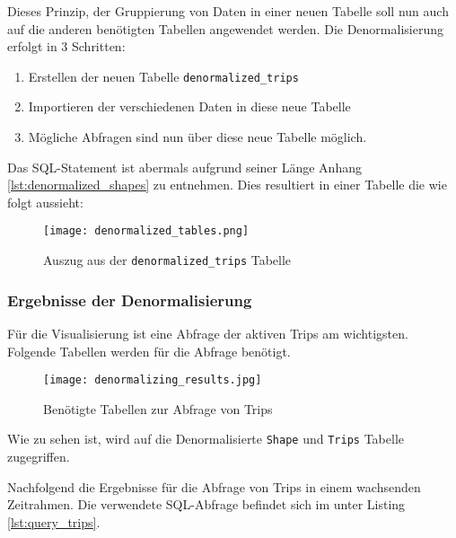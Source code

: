     Dieses Prinzip, der Gruppierung von Daten in einer neuen Tabelle soll nun auch auf die anderen benötigten Tabellen angewendet werden. Die Denormalisierung erfolgt in 3 Schritten:

    \begin{enumerate}
      \item Erstellen der neuen Tabelle \texttt{denormalized\_trips}
      \item Importieren der verschiedenen Daten in diese neue Tabelle
      \item Mögliche Abfragen sind nun über diese neue Tabelle möglich.
    \end{enumerate}

    Das SQL-Statement ist abermals aufgrund seiner Länge Anhang \ref{lst:denormalized_shapes} zu entnehmen. Dies resultiert in einer Tabelle die wie folgt aussieht:

    \begin{figure}[htbp]
      \begin{center}
        \texttt{[image: denormalized\_tables.png]}
        \caption{Auszug aus der \texttt{denormalized\_trips} Tabelle}
        \label{fig:denormalized_table}
      \end{center}
    \end{figure}  

    \subsubsection*{Ergebnisse der Denormalisierung}
    \label{ssub:ergebnisse_der_denormalisierung}
      Für die Visualisierung ist eine Abfrage der aktiven Trips am wichtigsten.
      Folgende Tabellen werden für die Abfrage benötigt.

      \begin{figure}[htbp]
        \begin{center}
          \texttt{[image: denormalizing\_results.jpg]}
          \caption{Benötigte Tabellen zur Abfrage von Trips}
          \label{fig:denormalizing_results}
        \end{center}
      \end{figure}

      Wie zu sehen ist, wird auf die Denormalisierte \texttt{Shape} und \texttt{Trips} Tabelle zugegriffen.

      Nachfolgend die Ergebnisse für die Abfrage von Trips in einem wachsenden Zeitrahmen. Die verwendete SQL-Abfrage befindet sich im  unter Listing \ref{lst:query_trips}.

